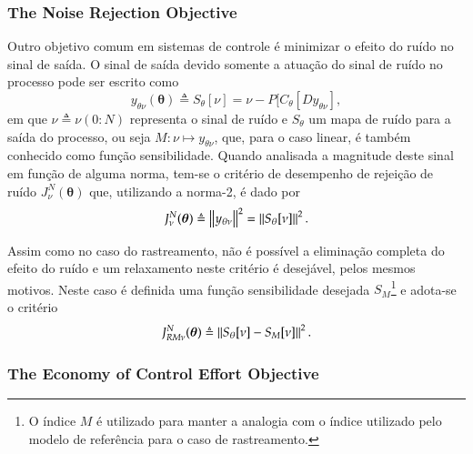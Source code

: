 \subsubsection{The Noise Rejection Objective}%
\label{sub:the_noise_rejection_objective}

Outro objetivo comum em sistemas de controle é minimizar o efeito do ruído no sinal de saída. O sinal de saída devido somente a atuação do sinal de ruído no processo pode ser escrito como
\begin{equation}
   y_{\theta\nu}(\bm{\theta}) \triangleq S_\theta[\nu] = \nu-P[C_\theta[Dy_{\theta\nu}],
\end{equation}
em que $\nu \triangleq \nu(0{:}N)$ representa o sinal de ruído e $S_{\theta}$ um mapa de ruído para a saída do processo, ou seja $M:\nu \mapsto y_{\theta\nu}$, que, para o caso linear, é também conhecido como função sensibilidade. Quando analisada a magnitude deste sinal em função de alguma norma, tem-se o critério de desempenho de rejeição de ruído $J_\nu^N(\bm{\theta})$ que, utilizando a norma-2, é dado por
\begin{equation}
   J_\nu^N(\bm{\theta}) \triangleq \left\lVert y_{\theta\nu} \right\rVert^2 = \left\lVert S_\theta[\nu] \right\rVert^2.
   \label{eq:Jnoise}
\end{equation}

Assim como no caso do rastreamento, não é possível a eliminação completa do efeito do ruído e um relaxamento neste critério é desejável, pelos mesmos motivos. Neste caso é definida uma função sensibilidade desejada $S_{M}$\footnote{O índice $M$ é utilizado para manter a analogia com o índice utilizado pelo modelo de referência para o caso de rastreamento.} e adota-se o critério
\begin{equation}
   J_{RM\nu}^N(\bm{\theta}) \triangleq  \left\lVert S_\theta[\nu] - S_M[\nu]\right\rVert^{2}.
   \label{eq:JeRM}
\end{equation}





\subsubsection{The Economy of Control Effort Objective}%
\label{sub:the_economy_of_control_effot_objective}

